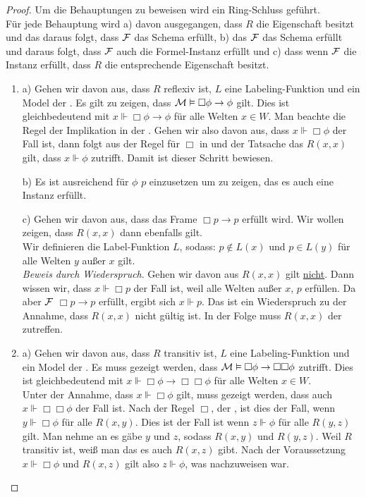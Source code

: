 \begin{proof}
	Um die Behauptungen zu beweisen wird ein Ring-Schluss geführt.\\
	Für jede Behauptung wird a) davon ausgegangen, dass $R$ die Eigenschaft besitzt und das daraus folgt, dass $\mathcal{F}$ das Schema erfüllt, b) das $\mathcal{F}$ das Schema erfüllt und daraus folgt, dass $\mathcal{F}$ auch die Formel-Instanz erfüllt und c) dass wenn $\mathcal{F}$ die Instanz erfüllt, dass $R$ die entsprechende Eigenschaft besitzt.
	
	\begin{enumerate}
		\item a) Gehen wir davon aus, dass $R$ reflexiv ist, $L$ eine Labeling-Funktion und \ModelDef ein Model der \NML. 
		Es gilt zu zeigen, dass $\mathcal{M} \vDash \Box\phi \rightarrow \phi$ gilt. 
		Dies ist gleichbedeutend mit $x \Vdash \Box \phi \rightarrow \phi$ für alle Welten $x \in W$.
		Man beachte die Regel der Implikation in der .
		Gehen wir also davon aus, dass $x \Vdash \Box \phi$ der Fall ist, dann folgt aus der Regel für $\Box$ in  und der Tatsache das $R(x,x)$ gilt, dass $x \Vdash \phi$ zutrifft. 
		Damit ist dieser Schritt bewiesen.
		
		b) Es ist ausreichend für $\phi$ $p$ einzusetzen um zu zeigen, das es auch eine Instanz erfüllt.
		
		c) Gehen wir davon aus, dass das Frame $\Box p \rightarrow p$ erfüllt wird.
		Wir wollen zeigen, dass $R(x,x)$ dann ebenfalls gilt.\\
		Wir definieren die Label-Funktion $L$, sodass: $p \notin L(x)$ und $p \in L(y)$ für alle Welten $y$ außer $x$ gilt.\\
		\emph{Beweis durch Wiederspruch}. Gehen wir davon aus $R(x,x)$ gilt \underline{nicht}.
		Dann wissen wir, dass $x \Vdash \Box p$ der Fall ist, weil alle Welten außer $x$, $p$ erfüllen.
		Da aber $\mathcal{F}$ $\Box p \rightarrow p$ erfüllt, ergibt sich $x \Vdash p$.
		Das ist ein Wiederspruch zu der Annahme, dass $R(x,x)$ nicht gültig ist.
		In der Folge muss $R(x,x)$ der zutreffen.
		
		\item a) Gehen wir davon aus, dass $R$ transitiv ist, $L$ eine Labeling-Funktion und \ModelDef ein Model der \NML. 
		Es muss gezeigt werden, dass $\mathcal{M} \vDash \Box \phi \rightarrow \Box \Box \phi$ zutrifft. 
		Dies ist gleichbedeutend mit $x \Vdash \Box \phi \rightarrow \Box \Box \phi$ für alle Welten $x \in W$.\\
		Unter der Annahme, dass $x \Vdash \Box \phi$ gilt, muss gezeigt werden, dass auch $x \Vdash \Box \Box \phi$ der Fall ist. 
		Nach der Regel $\Box$, der , ist dies der Fall, wenn $y \Vdash \Box \phi$ für alle $R(x,y)$.
		Dies ist der Fall ist wenn $z \Vdash \phi$ für alle $R(y,z)$ gilt.
		Man nehme an es gäbe $y$ und $z$, sodass $R(x,y)$ und $R(y,z)$.
		Weil $R$ transitiv ist, weiß man das es auch $R(x,z)$ gibt.
		Nach der Voraussetzung $x \Vdash \Box \phi$ und $R(x,z)$ gilt also $z \Vdash \phi$, was nachzuweisen war.
		

\end{enumerate}
\end{proof}
